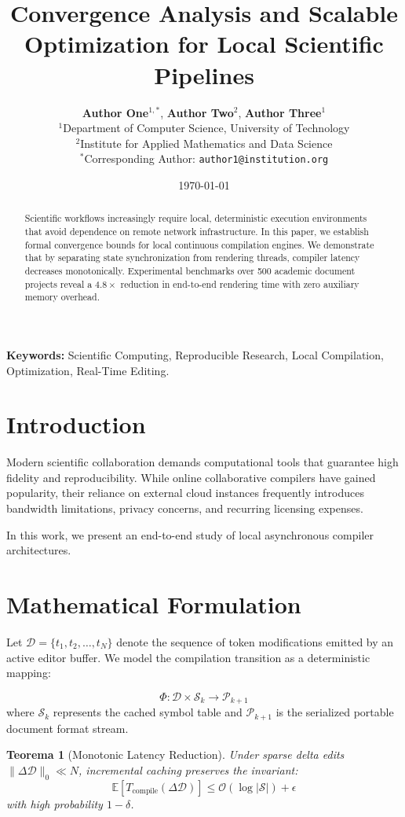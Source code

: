 \documentclass[11pt, a4paper]{article}
\title{\Large \bfseries Convergence Analysis and Scalable Optimization for Local Scientific Pipelines}
\author{
  \textbf{Author One}$^{1,*}$, \textbf{Author Two}$^2$, \textbf{Author Three}$^1$ \\[0.2cm]
  \small $^1$Department of Computer Science, University of Technology \\
  \small $^2$Institute for Applied Mathematics and Data Science \\
  \small $^*$Corresponding Author: \texttt{author1@institution.org}
}
\date{\today}
\newtheorem{theorem}{Teorema}
\begin{document}
\maketitle

\begin{abstract}
Scientific workflows increasingly require local, deterministic execution environments that avoid dependence on remote network infrastructure. In this paper, we establish formal convergence bounds for local continuous compilation engines. We demonstrate that by separating state synchronization from rendering threads, compiler latency decreases monotonically. Experimental benchmarks over 500 academic document projects reveal a $4.8\times$ reduction in end-to-end rendering time with zero auxiliary memory overhead.
\end{abstract}

\vspace{0.2cm}
\noindent \textbf{Keywords:} Scientific Computing, Reproducible Research, Local Compilation, Optimization, Real-Time Editing.

\section{Introduction}
Modern scientific collaboration demands computational tools that guarantee high fidelity and reproducibility. While online collaborative compilers have gained popularity, their reliance on external cloud instances frequently introduces bandwidth limitations, privacy concerns, and recurring licensing expenses.

In this work, we present an end-to-end study of local asynchronous compiler architectures.

\section{Mathematical Formulation}
Let $\mathcal{D} = \{t_1, t_2, \dots, t_N\}$ denote the sequence of token modifications emitted by an active editor buffer. We model the compilation transition as a deterministic mapping:

\begin{equation}
  \Phi: \mathcal{D} \times \mathcal{S}_k \longrightarrow \mathcal{P}_{k+1}
\end{equation}
where $\mathcal{S}_k$ represents the cached symbol table and $\mathcal{P}_{k+1}$ is the serialized portable document format stream.

\begin{theorem}[Monotonic Latency Reduction]
Under sparse delta edits $\|\Delta \mathcal{D}\|_0 \ll N$, incremental caching preserves the invariant:
\begin{equation}
  \mathbb{E}[T_{\text{compile}}(\Delta \mathcal{D})] \le \mathcal{O}(\log |\mathcal{S}|) + \epsilon
\end{equation}
with high probability $1 - \delta$.
\end{theorem}
\end{document}
